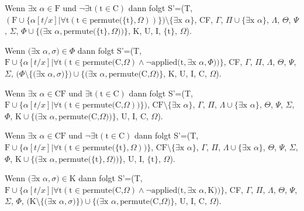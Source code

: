 Wenn $\exists\textrm{x}$ $\alpha\in\textrm{F}$ und $\neg\exists\textrm{t}(\textrm{t}\in\textrm{C})$ dann folgt S'=(T, $(\textrm{F}\cup\lbrace\alpha[t/x]|\forall\textrm{t}(\textrm{t}\in\textrm{permute(}\lbrace\textrm{t}\rbrace,\Omega))\rbrace)\setminus\lbrace\exists\textrm{x}$ $\alpha\rbrace$, CF, $\Gamma$, $\Pi\cup\lbrace\exists\textrm{x}$ $\alpha\rbrace$, $\Lambda$, $\Theta$, $\Psi$, $\Sigma$, $\Phi\cup\lbrace(\exists\textrm{x}$ $\alpha,\textrm{permute(}\lbrace\textrm{t}\rbrace,\Omega))\rbrace$, K, U, I, $\lbrace\textrm{t}\rbrace$, $\Omega$).

Wenn $(\exists\textrm{x}$ $\alpha, \sigma)\in\Phi$ dann folgt S'=(T, $\textrm{F}\cup\lbrace\alpha[t/x]|\forall\textrm{t}(\textrm{t}\in\textrm{permute(C,}\Omega)\wedge\neg\textrm{applied(t},\exists\textrm{x}$ $\alpha, \Phi))\rbrace$, CF, $\Gamma$, $\Pi$, $\Lambda$, $\Theta$, $\Psi$, $\Sigma$, $(\Phi\setminus\lbrace(\exists\textrm{x}$ $\alpha, \sigma)\rbrace)\cup\lbrace(\exists\textrm{x}$ $\alpha,\textrm{permute(C,}\Omega)\rbrace$, K, U, I, C, $\Omega$).

Wenn $\exists\textrm{x}$ $\alpha\in\textrm{CF}$ und $\exists\textrm{t}(\textrm{t}\in\textrm{C})$ dann folgt S'=(T, $\textrm{F}\cup\lbrace\alpha[t/x]|\forall\textrm{t}(\textrm{t}\in\textrm{permute(C,}\Omega))\rbrace)$, $\textrm{CF}\setminus\lbrace\exists\textrm{x}$ $\alpha\rbrace$, $\Gamma$, $\Pi$, $\Lambda\cup\lbrace\exists\textrm{x}$ $\alpha\rbrace$, $\Theta$, $\Psi$, $\Sigma$, $\Phi$, $\textrm{K}\cup\lbrace(\exists\textrm{x}$ $\alpha,\textrm{permute(C,}\Omega))\rbrace$, U, I, C, $\Omega$).

Wenn $\exists\textrm{x}$ $\alpha\in\textrm{CF}$ und $\neg\exists\textrm{t}(\textrm{t}\in\textrm{C})$ dann folgt S'=(T, $\textrm{F}\cup\lbrace\alpha[t/x]|\forall\textrm{t}(\textrm{t}\in\textrm{permute(}\lbrace\textrm{t}\rbrace,\Omega))\rbrace$, $\textrm{CF}\setminus\lbrace\exists\textrm{x}$ $\alpha\rbrace$, $\Gamma$, $\Pi$, $\Lambda\cup\lbrace\exists\textrm{x}$ $\alpha\rbrace$, $\Theta$, $\Psi$, $\Sigma$, $\Phi$, $\textrm{K}\cup\lbrace(\exists\textrm{x}$ $\alpha,\textrm{permute(}\lbrace\textrm{t}\rbrace,\Omega))\rbrace$, U, I, $\lbrace\textrm{t}\rbrace$, $\Omega$).

Wenn $(\exists\textrm{x}$ $\alpha, \sigma)\in\textrm{K}$ dann folgt S'=(T, $\textrm{F}\cup\lbrace\alpha[t/x]|\forall\textrm{t}(\textrm{t}\in\textrm{permute(C,}\Omega)\wedge\neg\textrm{applied(t},\exists\textrm{x}$ $\alpha, \textrm{K}))\rbrace$, CF, $\Gamma$, $\Pi$, $\Lambda$, $\Theta$, $\Psi$, $\Sigma$, $\Phi$, $(\textrm{K}\setminus\lbrace(\exists\textrm{x}$ $\alpha, \sigma)\rbrace)\cup\lbrace(\exists\textrm{x}$ $\alpha,\textrm{permute(C,}\Omega)\rbrace$, U, I, C, $\Omega$).


